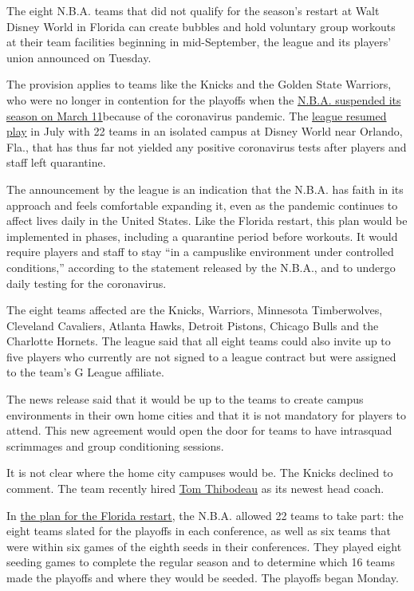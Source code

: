 The eight N.B.A. teams that did not qualify for the season's restart at
Walt Disney World in Florida can create bubbles and hold voluntary group
workouts at their team facilities beginning in mid-September, the league
and its players' union announced on Tuesday.

The provision applies to teams like the Knicks and the Golden State
Warriors, who were no longer in contention for the playoffs when the
\href{https://www.nytimes3xbfgragh.onion/2020/03/11/sports/basketball/nba-season-suspended-coronavirus.html}{N.B.A.
suspended its season on March 11}because of the coronavirus pandemic.
The
\href{https://www.nytimes3xbfgragh.onion/2020/07/22/sports/basketball/nba-restart-disney-world.html}{league
resumed play} in July with 22 teams in an isolated campus at Disney
World near Orlando, Fla., that has thus far not yielded any positive
coronavirus tests after players and staff left quarantine.

The announcement by the league is an indication that the N.B.A. has
faith in its approach and feels comfortable expanding it, even as the
pandemic continues to affect lives daily in the United States. Like the
Florida restart, this plan would be implemented in phases, including a
quarantine period before workouts. It would require players and staff to
stay ``in a campuslike environment under controlled conditions,''
according to the statement released by the N.B.A., and to undergo daily
testing for the coronavirus.

The eight teams affected are the Knicks, Warriors, Minnesota
Timberwolves, Cleveland Cavaliers, Atlanta Hawks, Detroit Pistons,
Chicago Bulls and the Charlotte Hornets. The league said that all eight
teams could also invite up to five players who currently are not signed
to a league contract but were assigned to the team's G League affiliate.

The news release said that it would be up to the teams to create campus
environments in their own home cities and that it is not mandatory for
players to attend. This new agreement would open the door for teams to
have intrasquad scrimmages and group conditioning sessions.

It is not clear where the home city campuses would be. The Knicks
declined to comment. The team recently hired
\href{https://www.nytimes3xbfgragh.onion/2020/07/30/sports/basketball/nba-knicks-coach-tom-thibodeau.html}{Tom
Thibodeau} as its newest head coach.

In
\href{https://www.nytimes3xbfgragh.onion/2020/06/04/sports/basketball/coronavirus-nba-disney-world-restart.html}{the
plan for the Florida restart}, the N.B.A. allowed 22 teams to take part:
the eight teams slated for the playoffs in each conference, as well as
six teams that were within six games of the eighth seeds in their
conferences. They played eight seeding games to complete the regular
season and to determine which 16 teams made the playoffs and where they
would be seeded. The playoffs began Monday.

